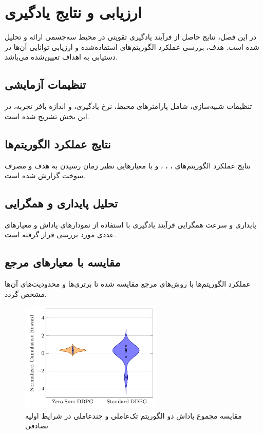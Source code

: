 \chapter{ارزیابی و نتایج یادگیری}

در این فصل، نتایج حاصل از فرآیند یادگیری تقویتی در محیط سه‌جسمی ارائه و تحلیل شده است. هدف، بررسی عملکرد الگوریتم‌های استفاده‌شده و ارزیابی توانایی آن‌ها در دستیابی به اهداف تعیین‌شده می‌باشد.

\section{تنظیمات آزمایشی}

تنظیمات شبیه‌سازی، شامل پارامترهای محیط، نرخ یادگیری، و اندازه بافر تجربه، در این بخش تشریح شده است.

\section{نتایج عملکرد الگوریتم‌ها}

نتایج عملکرد الگوریتم‌های ، ، ، و  با معیارهایی نظیر زمان رسیدن به هدف و مصرف سوخت گزارش شده است.

\section{تحلیل پایداری و همگرایی}

پایداری و سرعت همگرایی فرآیند یادگیری با استفاده از نمودارهای پاداش و معیارهای عددی مورد بررسی قرار گرفته است.

\section{مقایسه با معیارهای مرجع}

عملکرد الگوریتم‌ها با روش‌های مرجع مقایسه شده تا برتری‌ها و محدودیت‌های آن‌ها مشخص گردد.


\begin{figure}[H]
	\centering
	\includegraphics[width=0.6\textwidth]{plots/ddpg/violin_plot/initial_condition_shift}
	\caption{مقایسه مجموع پاداش دو الگوریتم تک‌عاملی و چندعاملی  در شرایط اولیه تصادفی}
\end{figure}

